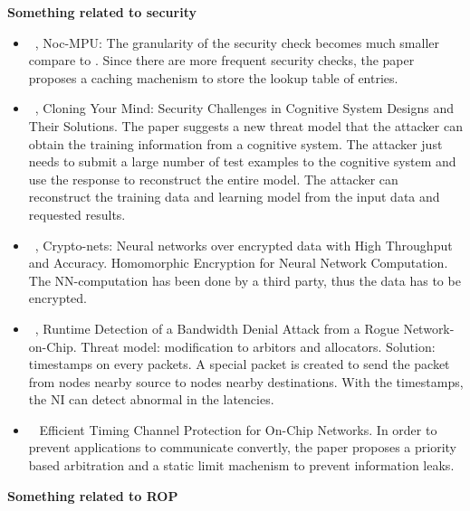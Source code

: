 \documentclass[]{article}
\begin{document}
\textbf{Something related to security}
\begin{itemize}
	\item ~\cite{porquet2011noc}, Noc-MPU: The granularity of the security check
	becomes much smaller compare to \cite{fiorin2008secure}. Since there are
	more frequent security checks, the paper proposes a caching machenism to
	store the lookup table of entries.
	\item ~\cite{liu2015cloning}, Cloning Your Mind: Security Challenges in
	Cognitive System Designs and Their Solutions. The paper suggests a new
	threat model that the attacker can obtain the training information from a
	cognitive system. The attacker just needs to submit a large number of test
	examples to the cognitive system and use the response to reconstruct the
	entire model. The attacker can reconstruct the training data and learning
	model from the input data and requested results.
	\item ~\cite{xie2014crypto}, Crypto-nets: Neural networks over encrypted
	data with High Throughput and Accuracy. Homomorphic Encryption for Neural
	Network Computation. The NN-computation has been done by a third party,
	thus the data has to be encrypted.
	\item ~\cite{js2015runtime}, Runtime Detection of a Bandwidth Denial Attack
	from a Rogue Network-on-Chip. Threat model: modification to arbitors and
	allocators.  Solution: timestamps on every packets. A special packet is created
	to send the packet from nodes nearby source to nodes nearby destinations. With
	the timestamps, the NI can detect abnormal in the latencies.
	\item ~\cite{wang2012efficient} Efficient Timing Channel Protection for
	On-Chip Networks. In order to prevent applications to communicate convertly,
	the paper proposes a priority based arbitration and a static limit machenism to
	prevent information leaks.
\end{itemize}
\newpage
\textbf{Something related to ROP}
\end{document}
